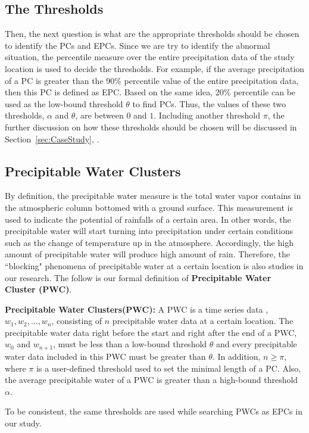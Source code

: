 \documentclass{acm_proc_article-sp}
\begin{document}
\subsection{The Thresholds}
\label{sec:Thresholds}
Then, the next question is what are the appropriate thresholds should be chosen to identify the PCs and EPCs. Since we are try to identify the abnormal situation, the percentile measure over the entire precipitation data of the study location is used to decide the thresholds. For example, if the average precipitation of a PC is greater than the 90\% percentile value of the entire precipitation data, then this PC is defined as EPC. Based on the same idea, 20\% percentile can be used as the low-bound threshold $\theta$ to find PCs.
Thus, the values of these two thresholds, $\alpha$ and $\theta$, are between $0$ and $1$. Including another threshold $\pi$, the further discussion on how these thresholds should be chosen will be discussed in Section~\ref{sec:CaseStudy}, .      

\subsection{Precipitable Water Clusters}
\label{sec:PWC}
By definition, the precipitable water measure is the total water vapor contains in the atmospheric column bottomed with a ground surface. This measurement is used to indicate the potential of rainfalls of a certain area. In other words, the precipitable water will start turning into precipitation under certain conditions such as the change of temperature up in the atmosphere. \cite{king2003cloud} Accordingly, the high amount of precipitable water will produce high amount of rain. 
\newline Therefore, the ``blocking" phenomena of precipitable water at a certain location is also studies in our research. The follow is our formal definition of \textbf{Precipitable Water Cluster (PWC)}. 
\begin{mydef} 
\label{def:PWC}
\textbf{Precipitable Water Clusters(PWC):} A PWC is a time series data , $w_1 , w_2 ,
\ldots , w_n $, consisting of $n$ precipitable water data at a certain location. The
precipitable water data right before the start and right after the end of a PWC, $w_0$
and $w_{n+1}$, must be less than a low-bound threshold $\theta$ and every
precipitable water data included in this PWC must be greater than $\theta$. In
addition, $n \geq \pi $, where $\pi $ is a user-defined threshold used to set
the minimal length of a PC. Also, the average precipitable water of a PWC is greater than a high-bound threshold $\alpha$.
\end{mydef} 
To be consistent, the same thresholds are used while searching PWCs as EPCs in our study.
\end{document}
